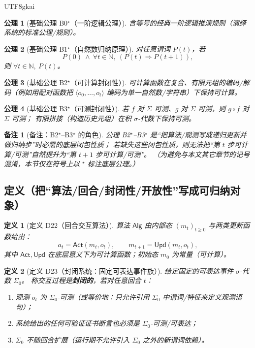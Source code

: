 \documentclass[12pt]{article}
\newtheorem{definition}{定义}[section]
\newtheorem{axiom}{公理}[section]
\newtheorem{remark}{备注}[section]
\newcommand{\NN}{\ensuremath{\mathbb{N}}}
\begin{document}
\begin{CJK*}{UTF8}{gkai}
\begin{axiom}[基础公理 B0$^\star$（一阶逻辑公理）]
含等号的经典一阶逻辑推演规则（演绎系统的标准公理/规则）。
\end{axiom}

\begin{axiom}[基础公理 B1$^\star$（自然数归纳原理）]
对任意谓词 $P(t)$，若
\[
  P(0)\ \wedge\ \forall t\in\NN,\ (P(t)\Rightarrow P(t+1)),
\]
则 $\forall t\in\NN,\ P(t)$。
\end{axiom}

\begin{axiom}[基础公理 B2$^\star$（可计算封闭性）]
可计算函数在复合、有限元组的编码/解码（例如用配对函数把 $\langle o_0,\dots,o_t\rangle$ 编码为单一自然数/字符串）下保持可计算。
\end{axiom}

\begin{axiom}[基础公理 B3$^\star$（可测封闭性）]
若 $f$ 对 $\Sigma$ 可测、$g$ 对 $\Sigma$ 可测，则 $g\circ f$ 对 $\Sigma$ 可测；
有限拼接（构造历史元组）在积 $\sigma$-代数下保持可测。
\end{axiom}

\begin{remark}[备注：B2$^\star$--B3$^\star$ 的角色]
公理 B2$^\star$--B3$^\star$ 是“把算法/观测写成递归更新并做归纳步”时必需的底层闭包性质；
若缺失这些闭包性质，则无法把“第 $t$ 步可计算/可测”自然提升为“第 $t+1$ 步可计算/可测”。
（为避免与本文其它章节的记号混淆，本节仅在符号上以 $^\star$ 标注底层公理。）
\end{remark}

\subsection{定义（把“算法/回合/封闭性/开放性”写成可归纳对象）}
\label{sec:tex24-ta-tb-tc-defs}

\begin{definition}[定义 D22（回合交互算法）]
\label{def:d22-round-alg}
算法 $\mathsf{Alg}$ 由内部态 $(m_t)_{t\ge 0}$ 与两类更新函数给出：
\[
  a_t=\mathsf{Act}(m_t,o_t),\qquad
  m_{t+1}=\mathsf{Upd}(m_t,o_t),
\]
其中 $\mathsf{Act},\mathsf{Upd}$ 在底层意义下为可计算函数；初始态 $m_0$ 为常量（可计算）。
\end{definition}

\begin{definition}[定义 D23（封闭系统：固定可表达事件族）]
\label{def:d23-closed-sigma}
给定固定的可表达事件 $\sigma$-代数 $\Sigma_0$。
称交互过程是\textbf{封闭的}，若对任意回合 $t$：
\begin{enumerate}
  \item 观测 $o_t$ 为 $\Sigma_0$-可测（或等价地：只允许引用 $\Sigma_0$ 中谓词/特征来定义观测语句）；
  \item 系统给出的任何可验证证书断言也必须是 $\Sigma_0$-可测/可表达；
  \item $\Sigma_0$ 不随回合扩展（运行期不允许引入 $\Sigma_0$ 之外的新谓词依赖）。
\end{enumerate}
\end{definition}


\end{CJK*}
\end{document}
